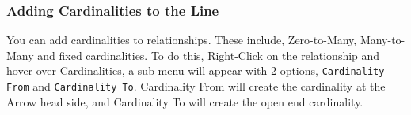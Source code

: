 \documentclass[a4paper]{article}
\begin{document}
\subsubsection{Adding Cardinalities to the Line}
You can add cardinalities to relationships. These include, Zero-to-Many, Many-to-Many and fixed cardinalities. To do this, Right-Click on the relationship and hover over Cardinalities, a sub-menu will appear with 2 options, \texttt{Cardinality From} and \texttt{Cardinality To}. Cardinality From will create the cardinality at the Arrow head side, and Cardinality To will create the open end cardinality. 

\begin{figure}[H]
\begin{center}
 \imagespace
{}

\end{center}
\end{figure}
\end{document}
